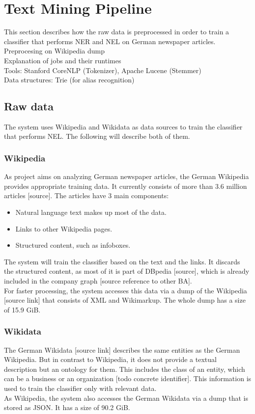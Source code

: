 \section{Text Mining Pipeline}
\label{sec:pipeline}
This section describes how the raw data is preprocessed in order to train a classifier that performs NER and NEL on German newspaper articles.
~\\
Preprocesing on Wikipedia dump\\
Explanation of jobs and their runtimes\\
Tools: Stanford CoreNLP (Tokenizer), Apache Lucene (Stemmer)\\
Data structures: Trie (for alias recognition)\\

\subsection{Raw data}
The system uses Wikipedia and Wikidata as data sources to train the classifier that performs NEL. The following will describe both of them.

\subsubsection{Wikipedia}
As project aims on analyzing German newspaper articles, the German Wikipedia provides appropriate training data. It currently consists of more than 3.6 million articles [source]. The articles have 3 main components:
\begin{itemize}
\item Natural language text makes up most of the data.
\item Links to other Wikipedia pages.
\item Structured content, such as infoboxes.
\end{itemize}
The system will train the classifier based on the text and the links. It discards the structured content, as most of it is part of DBpedia [source], which is already included in the company graph [source reference to other BA].\\
For faster processing, the system accesses this data via a dump of the Wikipedia [source link] that consists of XML and Wikimarkup. The whole dump has a size of 15.9 GiB.

\subsubsection{Wikidata}
The German Wikidata [source link] describes the same entities as the German Wikipedia. But in contrast to Wikipedia, it does not provide a textual description but an ontology for them. This includes the class of an entity, which can be a business or an organization [todo concrete identifier]. This information is used to train the classifier only with relevant data.\\
As Wikipedia, the system also accesses the German Wikidata via a dump that is stored as JSON. It has a size of 90.2 GiB.

